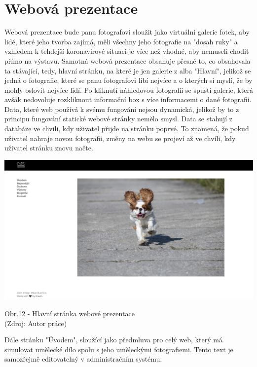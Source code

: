 \documentclass[12pt,a4paper]{report}
\begin{document}
  \chapter{Webová prezentace}
  Webová prezentace bude panu fotografovi sloužit jako virtuální galerie fotek, aby lidé, které jeho
  tvorba zajímá, měli všechny jeho fotografie na "dosah ruky" a vzhledem k tehdejší koronavirové
  situaci je více než vhodné, aby nemuseli chodit přímo na výstavu.
  Samotná webová prezentace obsahuje přesně to, co obsahovala ta stávající, tedy, hlavní stránku,
  na které je jen galerie z alba "Hlavní", jelikož se jedná o fotografie, které se panu fotografovi líbí
  nejvíce a o kterých si myslí, že by mohly oslovit nejvíce lidí. Po kliknutí náhledovou fotografii se
  spustí galerie, která avšak nedovoluje rozkliknout informační box s více informacemi o dané
  fotografii.
  Data, které web používá k svému fungování nejsou dynamická, jelikož by to z principu fungování
  statické webové stránky nemělo smysl. Data se stahují z databáze ve chvíli, kdy uživatel přijde na
  stránku poprvé. To znamená, že pokud uživatel nahraje novou fotografii, změny na webu se
  projeví až ve chvíli, kdy uživatel stránku znovu načte.

  \vspace*{0.5cm}
  \noindent\includegraphics[width=\linewidth]{dmp-bures.png}
  \begin{center}
    Obr.12 -  Hlavní stránka webové prezentace \\
    (Zdroj: Autor práce)
  \end{center}
  \vspace*{0.5cm}

  Dále stránku "Úvodem", sloužící jako předmluva pro celý web, který má simulovat umělecké
  dílo spolu s jeho uměleckými fotografiemi. Tento text je samozřejmě editovatelný v
  administračním systému.
  
\end{document}
